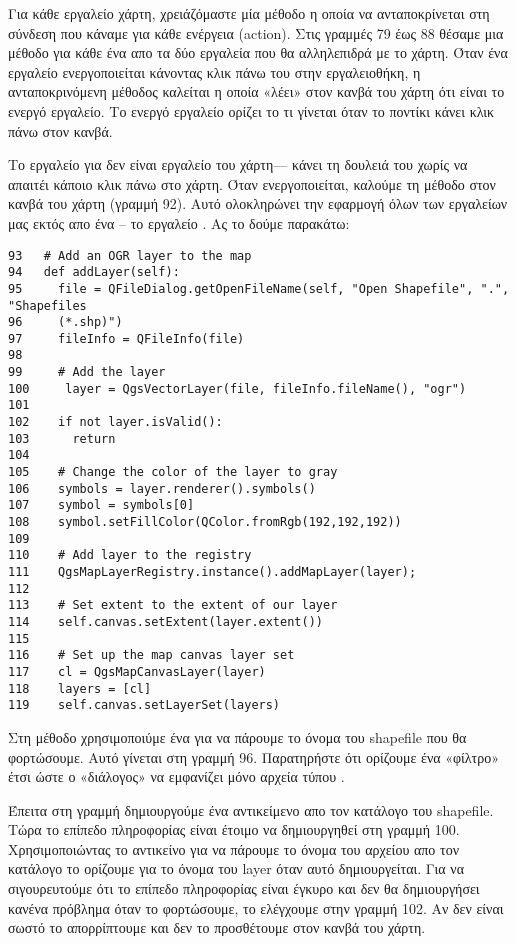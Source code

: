 Για κάθε εργαλείο χάρτη, χρειάζόμαστε μία μέθοδο η οποία να ανταποκρίνεται στη σύνδεση που κάναμε για κάθε ενέργεια (action). Στις γραμμές 79 έως 88 θέσαμε μια μέθοδο για κάθε ένα απο τα δύο εργαλεία που θα αλληλεπιδρά με το χάρτη. Όταν ένα εργαλείο ενεργοποιείται κάνοντας κλικ πάνω του στην εργαλειοθήκη, η ανταποκρινόμενη μέθοδος καλείται η οποία «λέει» στον κανβά του χάρτη ότι είναι το ενεργό εργαλείο. Το ενεργό εργαλείο ορίζει το τι γίνεται όταν το ποντίκι κάνει κλικ πάνω στον κανβά. 

Το εργαλείο για  δεν είναι εργαλείο του χάρτη--- κάνει τη δουλειά του χωρίς να απαιτέι κάποιο κλικ πάνω στο χάρτη.  Όταν ενεργοποιείται, καλούμε τη μέθοδο
 στον κανβά του χάρτη (γραμμή 92).  Αυτό ολοκληρώνει την εφαρμογή όλων των εργαλείων μας εκτός απο ένα – το εργαλείο . %
Ας το δούμε παρακάτω: 

\begin{verbatim}
93   # Add an OGR layer to the map
94   def addLayer(self):
95     file = QFileDialog.getOpenFileName(self, "Open Shapefile", ".", "Shapefiles
96     (*.shp)")
97     fileInfo = QFileInfo(file)
98 
99     # Add the layer
100     layer = QgsVectorLayer(file, fileInfo.fileName(), "ogr")
101
102    if not layer.isValid():
103      return
104
105    # Change the color of the layer to gray
106    symbols = layer.renderer().symbols()
107    symbol = symbols[0]
108    symbol.setFillColor(QColor.fromRgb(192,192,192))
109
110    # Add layer to the registry
111    QgsMapLayerRegistry.instance().addMapLayer(layer);
112
113    # Set extent to the extent of our layer
114    self.canvas.setExtent(layer.extent())
115
116    # Set up the map canvas layer set
117    cl = QgsMapCanvasLayer(layer)
118    layers = [cl]
119    self.canvas.setLayerSet(layers)
\end{verbatim}

Στη μέθοδο  χρησιμοποιύμε ένα  για να πάρουμε το όνομα του shapefile που θα φορτώσουμε. Αυτό γίνεται στη γραμμή 96.
Παρατηρήστε ότι ορίζουμε ένα «φίλτρο» έτσι ώστε ο «διάλογος» να εμφανίζει μόνο αρχεία τύπου .

Έπειτα στη γραμμή δημιουργούμε ένα αντικείμενο  απο τον κατάλογο του shapefile. Τώρα το επίπεδο πληροφορίας είναι έτοιμο να δημιουργηθεί στη γραμμή 100. Χρησιμοποιώντας το αντικείνο
 για να πάρουμε το όνομα του αρχείου απο τον κατάλογο το ορίζουμε για το όνομα του layer όταν αυτό δημιουργείται. Για να σιγουρευτούμε ότι το επίπεδο πληροφορίας είναι έγκυρο και δεν θα δημιουργήσει κανένα πρόβλημα όταν το φορτώσουμε, το ελέγχουμε στην γραμμή 102. Αν δεν είναι σωστό το απορρίπτουμε και δεν το προσθέτουμε στον κανβά του χάρτη.

